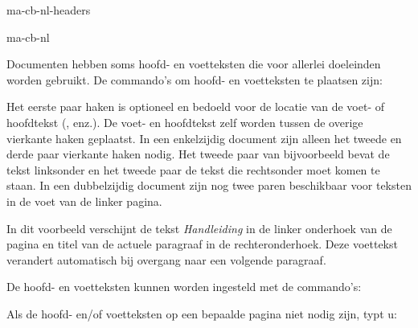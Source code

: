 \startonderdeel ma-cb-nl-headers

\produkt ma-cb-nl




Documenten hebben soms hoofd- en voetteksten die voor
allerlei doeleinden worden gebruikt. De commando's om hoofd-
en voetteksten te plaatsen zijn:


Het eerste paar haken is optioneel en bedoeld voor de
locatie van de voet- of hoofdtekst (,
 enz.). De voet- en hoofdtekst zelf worden tussen
de overige vierkante haken geplaatst. In een enkelzijdig
document zijn alleen het tweede en derde paar vierkante
haken nodig. Het tweede paar van bijvoorbeeld
\type{\stelvoettekstenin} bevat de tekst linksonder en het
tweede paar de tekst die rechtsonder moet komen te staan. In
een dubbelzijdig document zijn nog twee paren beschikbaar
voor teksten in de voet van de linker pagina.

\startbuffer
\stelvoettekstenin[Handleiding][paragraaf]
\stopbuffer

\typebuffer

In dit voorbeeld verschijnt de tekst {\em Handleiding} in de
linker onderhoek van de pagina en titel van de actuele
paragraaf in de rechteronderhoek. Deze voettekst verandert
automatisch bij overgang naar een volgende paragraaf.

De hoofd- en voetteksten kunnen worden ingesteld met de
commando's:


Als de hoofd- en/of voetteksten op een bepaalde pagina niet
nodig zijn, typt u:

\starttypen
\geenhoofdenvoetregels
\stoptypen

\stoponderdeel

